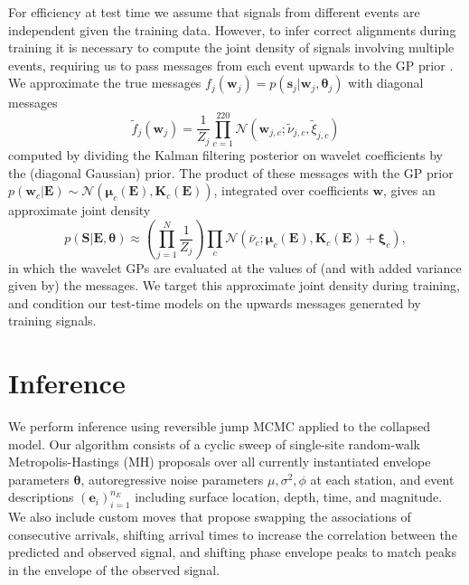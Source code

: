 \documentclass[twoside]{article} \usepackage{aistats2017}
\newcommand{\N}{\mathcal{N}}
\renewcommand{\v}[1]{\mathbf{#1}}
\begin{document}
For efficiency at test time we assume that signals from different
events are independent given the training data. However, to
infer correct alignments during training it is necessary to compute
the joint density of signals involving multiple events, requiring us to
pass messages from each event upwards to the GP prior
\citep{koller2009probabilistic}. We approximate the true messages $f_j(\v{w}_j) =
p(\v{s}_j | \v{w}_j, \v{\theta}_j)$ with diagonal
messages \[\tilde{f}_j(\v{w}_j) = \frac{1}{Z_j}\prod_{c=1}^{220} \N(\v{w}_{j,c};
\tilde{\nu}_{j,c}, \tilde{\xi}_{j,c})\] computed by dividing the Kalman
filtering posterior on wavelet coefficients by the (diagonal Gaussian)
prior. The product of these messages with the GP prior $p(\v{w}_c | \v{E})
\sim \N(\v{\mu}_c(\v{E}), \v{K}_c(\v{E}) )$, integrated over coefficients $\v{w}$, gives an approximate
joint density
\begin{equation}
p(\v{S} | \v{E}, \v{\theta}) \approx \left(\prod_{j=1}^N
  \frac{1}{Z_j} \right) \prod_c \N\left(\bar{\nu}_c; \v{\mu}_c(\v{E}),   \v{K}_c(\v{E}) + \v{\xi}_{c} \right)\label{eqn:efficient_joint_density},
\end{equation}
in which the wavelet GPs are evaluated at the values of (and
with added variance given by) the messages. We target this
approximate joint density during training, and condition our test-time
models on the upwards messages generated by training signals. 

\section{Inference}

We perform inference using reversible jump MCMC \citep{rjmcmc} applied
to the collapsed model. Our algorithm consists of a cyclic sweep of
single-site random-walk Metropolis-Hastings (MH) proposals over all currently
instantiated envelope parameters $\v{\theta}$, autoregressive noise
parameters $\mu, \sigma^2, \phi$ at each station, and event
descriptions $(\v{e}_i)_{i=1}^{n_E}$ including surface location,
depth, time, and magnitude. We also include custom
moves that propose swapping the associations of consecutive arrivals, shifting arrival times to
increase the correlation between the predicted and observed signal,
and shifting phase envelope peaks to match peaks in the envelope of
the observed signal. 
\end{document}
